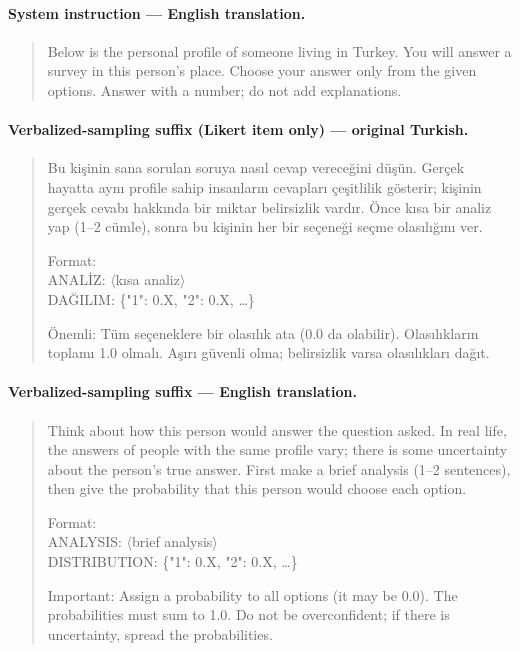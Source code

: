 \paragraph{System instruction — English translation.}
\begin{quote}
Below is the personal profile of someone living in Turkey. You will answer a
survey in this person's place. Choose your answer only from the given
options. Answer with a number; do not add explanations.
\end{quote}

\paragraph{Verbalized-sampling suffix (Likert item only) — original
Turkish.}
\begin{quote}
Bu kişinin sana sorulan soruya nasıl cevap vereceğini düşün. Gerçek hayatta
aynı profile sahip insanların cevapları çeşitlilik gösterir; kişinin gerçek
cevabı hakkında bir miktar belirsizlik vardır. Önce kısa bir analiz yap (1--2
cümle), sonra bu kişinin her bir seçeneği seçme olasılığını ver.

Format:\\
ANALİZ: $\langle$kısa analiz$\rangle$\\
DAĞILIM: \{"1": 0.X, "2": 0.X, \ldots\}

Önemli: Tüm seçeneklere bir olasılık ata (0.0 da olabilir). Olasılıkların
toplamı 1.0 olmalı. Aşırı güvenli olma; belirsizlik varsa olasılıkları
dağıt.
\end{quote}

\paragraph{Verbalized-sampling suffix — English translation.}
\begin{quote}
Think about how this person would answer the question asked. In real life,
the answers of people with the same profile vary; there is some uncertainty
about the person's true answer. First make a brief analysis (1--2
sentences), then give the probability that this person would choose each
option.

Format:\\
ANALYSIS: $\langle$brief analysis$\rangle$\\
DISTRIBUTION: \{"1": 0.X, "2": 0.X, \ldots\}

Important: Assign a probability to all options (it may be 0.0). The
probabilities must sum to 1.0. Do not be overconfident; if there is
uncertainty, spread the probabilities.
\end{quote}

